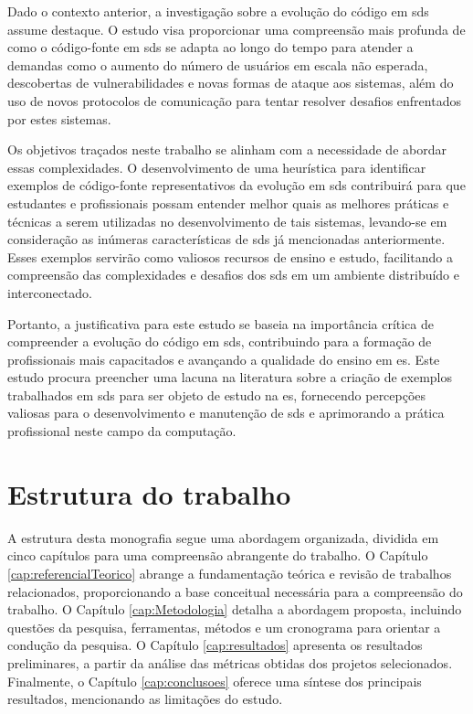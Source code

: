 Dado o contexto anterior, a investigação sobre a evolução do código em \gls{sds} assume destaque. O estudo visa proporcionar uma compreensão mais profunda de como o código-fonte em \gls{sds} se adapta ao longo do tempo para atender a demandas como o aumento do número de usuários em escala não esperada, descobertas de vulnerabilidades e novas formas de ataque aos sistemas, além do uso de novos protocolos de comunicação para tentar resolver desafios enfrentados por estes sistemas.

Os objetivos traçados neste trabalho se alinham com a necessidade de abordar essas complexidades. O desenvolvimento de uma heurística para identificar exemplos de código-fonte representativos da evolução em \gls{sds} contribuirá para que estudantes e profissionais possam entender melhor quais as melhores práticas e técnicas a serem utilizadas no desenvolvimento de tais sistemas, levando-se em consideração as inúmeras características de \gls{sds} já mencionadas anteriormente. Esses exemplos servirão como valiosos recursos de ensino e estudo, facilitando a compreensão das complexidades e desafios dos \gls{sds} em um ambiente distribuído e interconectado.

Portanto, a justificativa para este estudo se baseia na importância crítica de compreender a evolução do código em \gls{sds}, contribuindo para a formação de profissionais mais capacitados e avançando a qualidade do ensino em \gls{es}. Este estudo procura preencher uma lacuna na literatura sobre a criação de exemplos trabalhados em \gls{sds} para ser objeto de estudo na \gls{es}, fornecendo percepções valiosas para o desenvolvimento e manutenção de \gls{sds} e aprimorando a prática profissional neste campo da computação.

\section{Estrutura do trabalho}
\label{sec:estruturaTrabalho}

A estrutura desta monografia segue uma abordagem organizada, dividida em cinco capítulos para uma compreensão abrangente do trabalho. O Capítulo \ref{cap:referencialTeorico} abrange a fundamentação teórica e revisão de trabalhos relacionados, proporcionando a base conceitual necessária para a compreensão do trabalho. O Capítulo \ref{cap:Metodologia} detalha a abordagem proposta, incluindo questões da pesquisa, ferramentas, métodos e um cronograma para orientar a condução da pesquisa. O Capítulo \ref{cap:resultados} apresenta os resultados preliminares, a partir da análise das métricas obtidas dos projetos selecionados. Finalmente, o Capítulo \ref{cap:conclusoes} oferece uma síntese dos principais resultados, mencionando as limitações do estudo.
